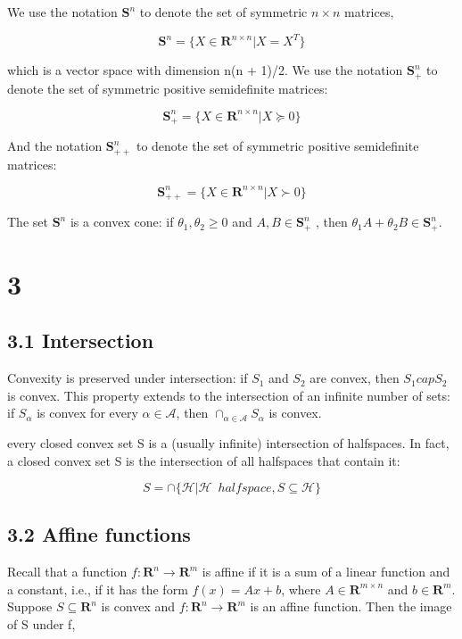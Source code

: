 \documentclass{article}
\begin{document}
We use the notation $\mathbf{S}^n$ to denote the set of symmetric $n \times n$ matrices,

\[
\mathbf{S}^n=\{X\in \mathbf{R}^{n\times n}| X=X^T\}    
\]

which is a vector space with dimension n(n + 1)/2. We use the notation $\mathbf{S}^n_+$ to denote the set of symmetric positive semidefinite matrices:

\[
\mathbf{S}^n_+=\{X\in \mathbf{R}^{n\times n}| X\succeq 0\}    
\]

And the notation $\mathbf{S}^n_{++}$ to denote the set of symmetric positive semidefinite matrices:

\[
\mathbf{S}^n_{++}=\{X\in \mathbf{R}^{n\times n}| X\succ 0\}    
\]

The set $\mathbf{S}^n$ is a convex cone: if $\theta_1, \theta_2 \ge 0$ and $A,B\in\mathbf{S}^n_+$
, then $\theta_1A+\theta_2B\in\mathbf{S}^n_+$.

\section*{3}

\subsection*{3.1 Intersection}

Convexity is preserved under intersection: if $S_1$ and $S_2$ are convex, then $S_1 cap S_2$ is
convex. This property extends to the intersection of an infinite number of sets: if $S_\alpha$ is convex for every $\alpha \in \mathcal{A}$, then
$\cap_{\alpha\in\mathcal{A}}S_\alpha$ is convex.

every closed convex set S is a (usually infinite) intersection of halfspaces.
In fact, a closed convex set S is the intersection of all halfspaces that contain it:

\[
S=\cap \{\mathcal{H}|\mathcal{H}\enspace halfspace, S\subseteq \mathcal{H}\}
\]

\subsection*{3.2 Affine functions}

Recall that a function $f:\mathbf{R}^n \rightarrow \mathbf{R}^m$ is affine if it is a sum of a linear function and
a constant, i.e., if it has the form $f(x)=Ax+b$, where $A\in\mathbf{R}^{m\times n}$ and $b \in\mathbf{R}^m$.
Suppose $S\subseteq\mathbf{R}^n$ is convex and $f:\mathbf{R}^n\rightarrow \mathbf{R}^m$ is an affine function. Then the image
of S under f,
\end{document}
